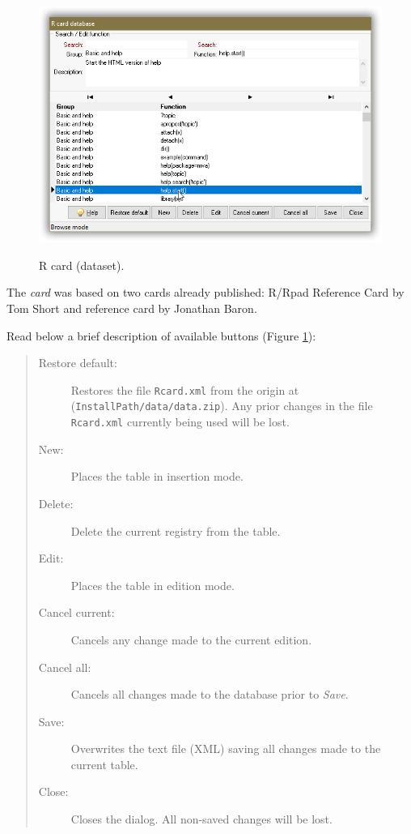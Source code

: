 \begin{figure}[H]
  \includegraphics[scale=0.8]{./res/dlg_r_card.png}\\
  \caption{R card (dataset).}
  \label{fig:dlg_r_card}
\end{figure}
The \textit{card} was based on two \RR{} cards already published:
R/Rpad Reference Card by Tom Short and \RR{} reference card by Jonathan Baron.

Read below a brief description of available buttons (Figure \ref{fig:dlg_r_card}):

\begin{quote}
  \begin{footnotesize}
    \begin{description}
      \item[Restore default:]
        Restores the file \texttt{Rcard.xml} from the origin at
        (\texttt{InstallPath/data/data.zip}). Any prior changes in the
        file \texttt{Rcard.xml} currently being used will be lost.
      \item[New:]
        Places the table in insertion mode.
      \item[Delete:]
        Delete the current registry from the table.
      \item[Edit:]
        Places the table in edition mode.
      \item[Cancel current:]
        Cancels any change made to the current edition.
      \item[Cancel all:]
        Cancels all changes made to the database prior to \textit{Save}.
      \item[Save:]
        Overwrites the text file (XML) saving all changes made to the current table.
      \item[Close:]
        Closes the dialog. All non-saved changes will be lost.
    \end{description}
  \end{footnotesize}
\end{quote}


